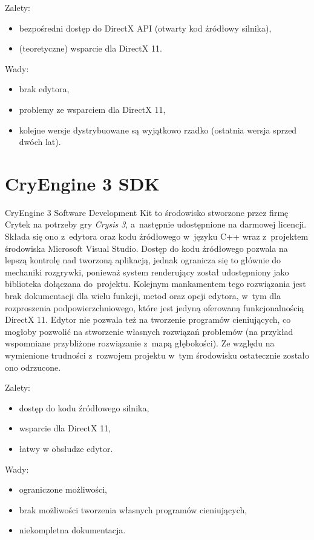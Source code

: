 {\raggedright Zalety:
\begin{itemize}
\item bezpośredni dostęp do DirectX API (otwarty kod źródłowy silnika),
\item (teoretyczne) wsparcie dla DirectX 11.
\end{itemize}

Wady:
\begin{itemize}
\item brak edytora,
\item problemy ze wsparciem dla DirectX 11,
\item kolejne wersje dystrybuowane są wyjątkowo rzadko (ostatnia wersja sprzed dwóch lat).
\end{itemize}
}
\section{CryEngine 3 SDK}

CryEngine 3 Software Development Kit to środowisko stworzone przez firmę Crytek na potrzeby gry \emph{Crysis 3}, a~następnie udostępnione na darmowej licencji. Składa się ono z~edytora oraz kodu źródłowego w~języku C++ wraz z~projektem środowiska Microsoft Visual Studio. Dostęp do kodu źródłowego pozwala na lepszą kontrolę nad tworzoną aplikacją, jednak ogranicza się to głównie do mechaniki rozgrywki, ponieważ system renderujący został udostępniony jako biblioteka dołączana do~projektu. Kolejnym mankamentem tego rozwiązania jest brak dokumentacji dla wielu funkcji, metod oraz opcji edytora, w~tym dla rozproszenia podpowierzchniowego, które jest jedyną oferowaną funkcjonalnością DirectX 11. Edytor nie pozwala też na tworzenie programów cieniujących, co mogłoby pozwolić na stworzenie własnych rozwiązań problemów (na przykład wspomniane przybliżone rozwiązanie z~mapą głębokości). Ze względu na wymienione trudności z~rozwojem projektu w~tym środowisku ostatecznie zostało ono odrzucone.\\

{\raggedright Zalety:
\begin{itemize}
\item dostęp do kodu źródłowego silnika,
\item wsparcie dla DirectX 11,
\item łatwy w obsłudze edytor.
\end{itemize}

Wady:
\begin{itemize}
\item ograniczone możliwości,
\item brak możliwości tworzenia własnych programów cieniujących,
\item niekompletna dokumentacja.
\end{itemize}
}

